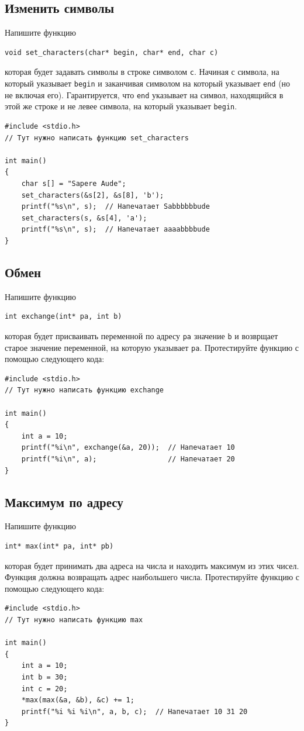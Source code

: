 \documentclass{article}
\begin{document}
\subsection{Изменить символы}
Напишите функцию
\begin{lstlisting}
void set_characters(char* begin, char* end, char c)
\end{lstlisting}
которая будет задавать символы в строке символом \texttt{c}. Начиная с символа, на который указывает \texttt{begin} и заканчивая символом на который указывает \texttt{end} (но не включая его). Гарантируется, что \texttt{end} указывает на символ, находящийся в этой же строке и не левее символа, на который указывает \texttt{begin}.
\begin{lstlisting}
#include <stdio.h>
// Тут нужно написать функцию set_characters

int main() 
{
    char s[] = "Sapere Aude";
    set_characters(&s[2], &s[8], 'b');
    printf("%s\n", s);  // Напечатает Sabbbbbbude
    set_characters(s, &s[4], 'a');
    printf("%s\n", s);  // Напечатает aaaabbbbude
}
\end{lstlisting}


\subsection{Обмен}
Напишите функцию
\begin{lstlisting}
int exchange(int* pa, int b)
\end{lstlisting}
которая будет присваивать переменной по адресу \texttt{pa} значение \texttt{b} и возврщает старое значение переменной, на которую указывает \texttt{pa}. Протестируйте функцию с помощью следующего кода:
\begin{lstlisting}
#include <stdio.h>
// Тут нужно написать функцию exchange

int main() 
{
    int a = 10;
    printf("%i\n", exchange(&a, 20));  // Напечатает 10
    printf("%i\n", a);                 // Напечатает 20
}
\end{lstlisting} 

\subsection{Максимум по адресу}
Напишите функцию
\begin{lstlisting}
int* max(int* pa, int* pb)
\end{lstlisting}
которая будет принимать два адреса на числа и находить максимум из этих чисел.
Функция должна возвращать адрес наибольшего числа. Протестируйте функцию с помощью следующего кода:
\begin{lstlisting}
#include <stdio.h>
// Тут нужно написать функцию max

int main() 
{
    int a = 10;
    int b = 30;
    int c = 20;
    *max(max(&a, &b), &c) += 1;
    printf("%i %i %i\n", a, b, c);  // Напечатает 10 31 20
}
\end{lstlisting} 
\end{document}
